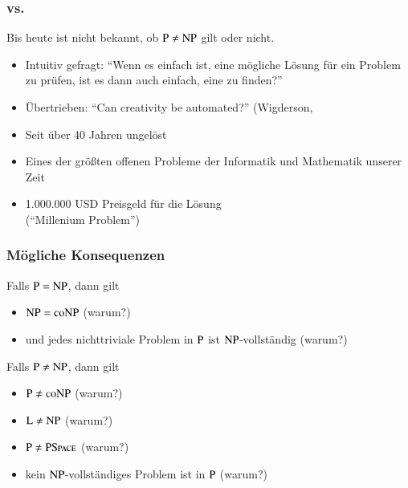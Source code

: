 \documentclass[onlymath]{beamer}
\begin{document}
\begin{frame}\frametitle{ vs. }

  \alert{Bis heute ist nicht bekannt, ob ${\textsc{P}}\neq{\textsc{NP}}$ gilt oder nicht.}
  \begin{itemize}
  \item Intuitiv gefragt: "`Wenn es einfach ist, eine mögliche Lösung für ein Problem zu prüfen, ist es dann auch einfach, eine zu finden?"'
  \item Übertrieben: "`Can creativity be automated?"' (Wigderson, 
  \item Seit über 40 Jahren ungelöst
  \item Eines der größten offenen Probleme der Informatik und Mathematik unserer Zeit
  \item 1.000.000 USD Preisgeld für die Lösung\\("`Millenium Problem"')
  \end{itemize}

\end{frame}

\begin{frame}\frametitle{Mögliche Konsequenzen}

\alert{Falls ${\textsc{P}}={\textsc{NP}}$, dann gilt}
\begin{itemize}
\item ${\textsc{NP}}={\textsc{coNP}}$ (warum?)
\item und jedes nichttriviale Problem in ${\textsc{P}}$ ist ${\textsc{NP}}$-vollständig (warum?)
\end{itemize}
\bigskip\pause

\alert{Falls ${\textsc{P}}\neq{\textsc{NP}}$, dann gilt}
\begin{itemize}
\item ${\textsc{P}}\neq{\textsc{coNP}}$ (warum?)
\item ${\textsc{L}}\neq{\textsc{NP}}$ (warum?)
\item ${\textsc{P}}\neq{\textsc{PSpace}}$ (warum?)
\item kein ${\textsc{NP}}$-vollständiges Problem ist in ${\textsc{P}}$ (warum?)
\end{itemize}

\end{frame}
\end{document}
